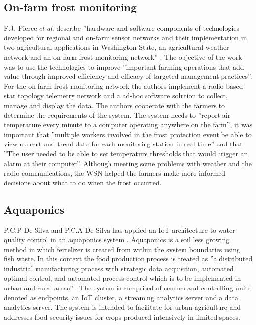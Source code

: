 \documentclass[]{uiophd}
\begin{document}
\subsection{On-farm frost monitoring}
F.J. Pierce \textit{et al}. describe ''hardware and software components of technologies developed for regional and on-farm sensor networks and their implementation in two agricultural applications in Washington State, an agricultural weather network and an on-farm frost monitoring network'' \cite[abstract]{PIERCE200832} . The objective of the work was to use the technologies to improve ''important farming operations that add value through improved efficiency and efficacy of targeted management practices''\cite[abstract]{PIERCE200832}. For the on-farm frost monitoring network the authors implement a radio based star topology telemetry network and a ad-hoc software solution to collect, manage and display the data. The authors cooperate with the farmers to determine the requirements of the system. The system needs to ''report air temperature every minute to a computer operating anywhere on the farm''\cite[p.~35]{PIERCE200832}, it was important that ''multiple workers involved in the frost protection event be able to view current and trend data for each monitoring station in real time''\cite[p.~36]{PIERCE200832} and that ''The user needed to be able to set temperature thresholds that would trigger an alarm at their computer''\cite[p.~36]{PIERCE200832}. Although meeting some problems with weather and the radio communications, the WSN helped the farmers make more informed decisions about what to do when the frost occurred. 

\subsection{Aquaponics}
P.C.P De Silva and P.C.A De Silva has applied an IoT architecture to water quality control in an aquaponics system \cite{desilva}. Aquaponics is a soil less growing method in which fertelizer is created from within the system boundaries using fish waste. In this context the food production process is treated as ''a distributed industrial manufacturing process with strategic data acquisition, automated optimal control, and automated process control which is to be implemented in urban and rural areas'' \cite[p.~1]{desilva}. The system is comprised of sensors and controlling units denoted as endpoints, an IoT cluster, a  streaming analytics server and a data analytics server. The system is intended to facilitate for urban agriculture and addresses food security issues for crops produced intensively in limited spaces.  
\end{document}

